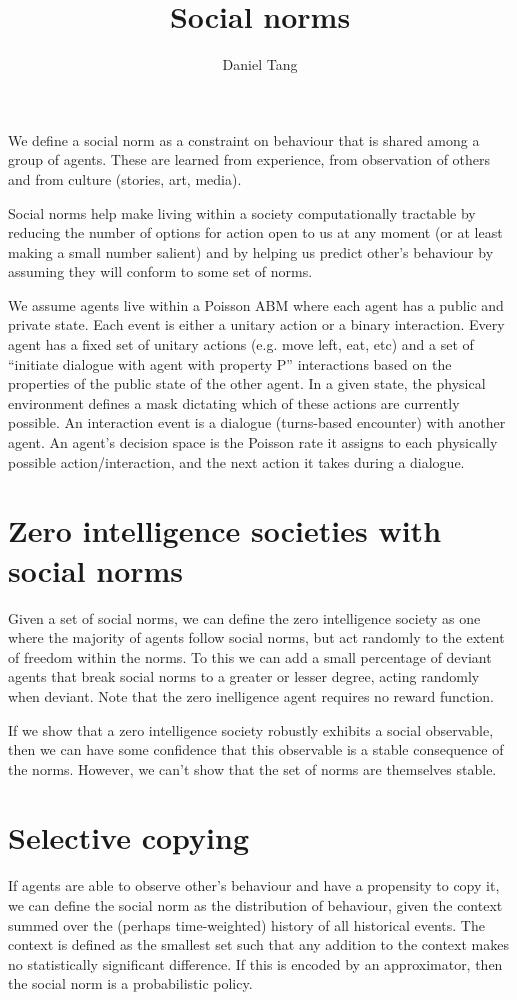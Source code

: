 \documentclass[a4paper]{article}
\title{Social norms}
\author{Daniel Tang}
\begin{document}
\maketitle

We define a social norm as a constraint on behaviour that is shared among a group of agents. These are learned from experience, from observation of others and from culture (stories, art, media).

Social norms help make living within a society computationally tractable by reducing the number of options for action open to us at any moment (or at least making a small number salient) and by helping us predict other's behaviour by assuming they will conform to some set of norms.

We assume agents live within a Poisson ABM where each agent has a public and private state. Each event is either a unitary action or a binary interaction. Every agent has a fixed set of unitary actions (e.g. move left, eat, etc) and a set of ``initiate dialogue with agent with property P'' interactions based on the properties of the public state of the other agent. In a given state, the physical environment defines a mask dictating which of these actions are currently possible. An interaction event is a dialogue (turns-based encounter) with another agent. An agent's decision space is the Poisson rate it assigns to each physically possible action/interaction, and the next action it takes during a dialogue.

\section{Zero intelligence societies with social norms}

Given a set of social norms, we can define the zero intelligence society as one where the majority of agents follow social norms, but act randomly to the extent of freedom within the norms. To this we can add a small percentage of deviant agents that break social norms to a greater or lesser degree, acting randomly when deviant. Note that the zero inelligence agent requires no reward function.

If we show that a zero intelligence society robustly exhibits a social observable, then we can have some confidence that this observable is a stable consequence of the norms. However, we can't show that the set of norms are themselves stable.

\section{Selective copying}
If agents are able to observe other's behaviour and have a propensity to copy it, we can define the social norm as the distribution of behaviour, given the context summed over the (perhaps time-weighted) history of all historical events. The context is defined as the smallest set such that any addition to the context makes no statistically significant difference. If this is encoded by an approximator, then the social norm is a probabilistic policy.
\end{document}
